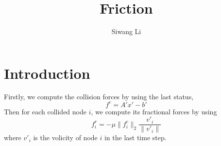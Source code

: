 \documentclass[9pt,twocolumn]{extarticle}
\author{Siwang Li}
\title{Friction}
\begin{document}
\maketitle

\setlength{\parskip}{0.5ex}

\section{Introduction}
Firstly, we compute the collision forces by using the last status,
\begin{equation}
  f^c = A'x' - b'
\end{equation}
Then for each collided node $i$, we compute its fractional forces by using
\begin{equation}
  f^r_i = -\mu \|f^c_i\|_2 \frac{v'_i}{\|v'_i\|}
\end{equation}
where $v'_i$ is the volicity of node $i$ in the last time step.
\end{document}
